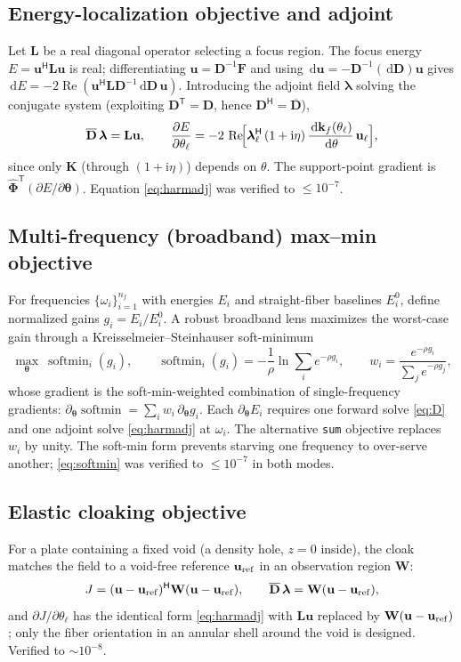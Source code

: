 \documentclass[11pt]{article}
\newcommand{\vth}{\bm{\theta}}
\newcommand{\vu}{\mathbf{u}}
\newcommand{\vF}{\mathbf{F}}
\newcommand{\vD}{\mathbf{D}}
\newcommand{\vK}{\mathbf{K}}
\newcommand{\vL}{\mathbf{L}}
\newcommand{\vW}{\mathbf{W}}
\newcommand{\vPhi}{\hat{\bm{\Phi}}}
\newcommand{\rmd}{\,\mathrm{d}}
\newcommand{\ii}{\mathrm{i}}
\newcommand{\T}{^{\mathsf{T}}}
\newcommand{\HH}{^{\mathsf{H}}}
\newcommand{\Real}{\operatorname{Re}}
\DeclareMathOperator{\softmin}{softmin}
\begin{document}
\subsection{Energy-localization objective and adjoint}
Let $\vL$ be a real diagonal operator selecting a focus region. The focus energy
$E=\vu\HH\vL\vu$ is real; differentiating $\vu=\vD^{-1}\vF$ and using
$\rmd\vu=-\vD^{-1}(\rmd\vD)\vu$ gives $\rmd E=-2\Real(\vu\HH\vL\vD^{-1}\rmd\vD\,
\vu)$. Introducing the adjoint field $\bm\lambda$ solving the conjugate system
(exploiting $\vD\T=\vD$, hence $\vD\HH=\overline{\vD}$),
\begin{equation}
  \overline{\vD}\,\bm\lambda=\vL\vu,\qquad
  \frac{\partial E}{\partial\theta_\ell}
  =-2\,\Real\!\Bigl[\bm\lambda_\ell\HH\,(1+\ii\eta)\,
  \frac{\rmd\mathbf{k}_f(\theta_\ell)}{\rmd\theta}\,\vu_\ell\Bigr],
  \label{eq:harmadj}
\end{equation}
since only $\vK$ (through $(1+\ii\eta)$) depends on $\theta$. The support-point
gradient is $\vPhi\T(\partial E/\partial\vth)$. Equation \eqref{eq:harmadj} was
verified to $\le\!10^{-7}$.

\subsection{Multi-frequency (broadband) max--min objective}
For frequencies $\{\omega_i\}_{i=1}^{n_f}$ with energies $E_i$ and straight-fiber
baselines $E_i^0$, define normalized gains $g_i=E_i/E_i^0$. A robust broadband
lens maximizes the worst-case gain through a Kreisselmeier--Steinhauser
soft-minimum
\begin{equation}
  \max_{\vth}\ \softmin_i(g_i),\qquad
  \softmin_i(g_i)=-\frac1\rho\ln\!\sum_i e^{-\rho g_i},\qquad
  w_i=\frac{e^{-\rho g_i}}{\sum_j e^{-\rho g_j}},
  \label{eq:softmin}
\end{equation}
whose gradient is the soft-min-weighted combination of single-frequency
gradients: $\partial_{\vth}\softmin=\sum_i w_i\,\partial_{\vth} g_i$. Each
$\partial_{\vth} E_i$ requires one forward solve \eqref{eq:D} and one adjoint solve
\eqref{eq:harmadj} at $\omega_i$. The alternative \texttt{sum} objective replaces
$w_i$ by unity. The soft-min form prevents starving one frequency to over-serve
another; \eqref{eq:softmin} was verified to $\le\!10^{-7}$ in both modes.

\subsection{Elastic cloaking objective}
For a plate containing a fixed void (a density hole, $z=0$ inside), the cloak
matches the field to a void-free reference $\vu_{\rm ref}$ in an observation
region $\vW$:
\begin{equation}
  J=(\vu-\vu_{\rm ref})\HH\vW(\vu-\vu_{\rm ref}),\qquad
  \overline{\vD}\,\bm\lambda=\vW(\vu-\vu_{\rm ref}),
\end{equation}
and $\partial J/\partial\theta_\ell$ has the identical form
\eqref{eq:harmadj} with $\vL\vu$ replaced by $\vW(\vu-\vu_{\rm ref})$; only the
fiber orientation in an annular shell around the void is designed. Verified to
$\sim\!10^{-8}$.
\end{document}
